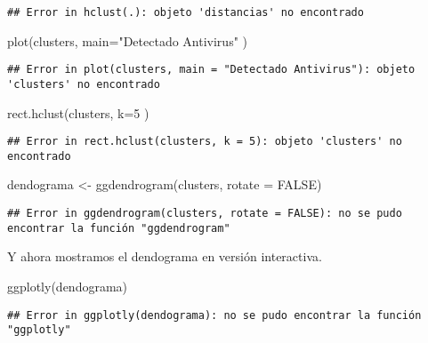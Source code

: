 \documentclass[
]{book}
\newenvironment{Shaded}{\begin{snugshade}}{\end{snugshade}}
\newcommand{\AttributeTok}[1]{\textcolor[rgb]{0.77,0.63,0.00}{#1}}
\newcommand{\ConstantTok}[1]{\textcolor[rgb]{0.00,0.00,0.00}{#1}}
\newcommand{\DecValTok}[1]{\textcolor[rgb]{0.00,0.00,0.81}{#1}}
\newcommand{\FunctionTok}[1]{\textcolor[rgb]{0.00,0.00,0.00}{#1}}
\newcommand{\NormalTok}[1]{#1}
\newcommand{\OtherTok}[1]{\textcolor[rgb]{0.56,0.35,0.01}{#1}}
\newcommand{\StringTok}[1]{\textcolor[rgb]{0.31,0.60,0.02}{#1}}
\begin{document}
\begin{verbatim}
## Error in hclust(.): objeto 'distancias' no encontrado
\end{verbatim}

\begin{Shaded}
\begin{Highlighting}[]
\FunctionTok{plot}\NormalTok{(clusters, }\AttributeTok{main=}\StringTok{"Detectado Antivirus"}\NormalTok{ )}
\end{Highlighting}
\end{Shaded}

\begin{verbatim}
## Error in plot(clusters, main = "Detectado Antivirus"): objeto 'clusters' no encontrado
\end{verbatim}

\begin{Shaded}
\begin{Highlighting}[]
\FunctionTok{rect.hclust}\NormalTok{(clusters, }\AttributeTok{k=}\DecValTok{5}\NormalTok{ )}
\end{Highlighting}
\end{Shaded}

\begin{verbatim}
## Error in rect.hclust(clusters, k = 5): objeto 'clusters' no encontrado
\end{verbatim}

\begin{Shaded}
\begin{Highlighting}[]
\NormalTok{dendograma }\OtherTok{\textless{}{-}} \FunctionTok{ggdendrogram}\NormalTok{(clusters, }\AttributeTok{rotate =} \ConstantTok{FALSE}\NormalTok{)}
\end{Highlighting}
\end{Shaded}

\begin{verbatim}
## Error in ggdendrogram(clusters, rotate = FALSE): no se pudo encontrar la función "ggdendrogram"
\end{verbatim}

Y ahora mostramos el dendograma en versión interactiva.

\begin{Shaded}
\begin{Highlighting}[]
\FunctionTok{ggplotly}\NormalTok{(dendograma)}
\end{Highlighting}
\end{Shaded}

\begin{verbatim}
## Error in ggplotly(dendograma): no se pudo encontrar la función "ggplotly"
\end{verbatim}
\end{document}
